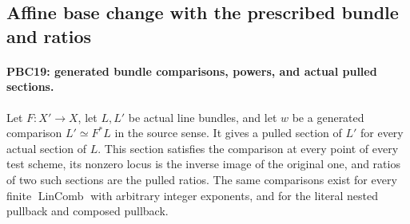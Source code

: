 \subsection{Affine base change with the prescribed bundle and ratios}

\paragraph{PBC19: generated bundle comparisons, powers, and actual pulled sections.}
\label{claim:PBC19}
Let $F:X'\to X$, let $L,L'$ be actual line bundles, and let
$w$ be a generated comparison $L'\simeq F^*L$ in the source
sense.  It gives a pulled section of $L'$ for every actual
section of $L$.  This section satisfies the comparison at
every point of every test scheme, its nonzero locus is the
inverse image of the original one, and ratios of two such
sections are the pulled ratios.
The same comparisons exist for every finite
$\operatorname{LinComb}$ with arbitrary integer exponents,
and for the literal nested pullback and composed pullback.

